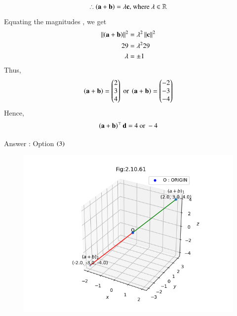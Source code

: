 \documentclass[journal]{IEEEtran}
\numberwithin{equation}{enumi}
\numberwithin{figure}{enumi}
\begin{document}
\begin{align}
   \therefore\left(\mathbf{a} + \mathbf{b}\right) = \lambda\mathbf{c}  \text{, where } \lambda \in \mathbb{R}
\end{align}
Equating the magnitudes , we get 
\begin{align}
    \left\lVert\left(\mathbf{a} + \mathbf{b}\right)\right\rVert^2 &= \lambda^2 \left\lVert\mathbf{c}\right\rVert^2 \\
    29 &= \lambda^2 29 \\ 
    \lambda &= \pm 1 
 \end{align}
Thus, 
\begin{align}
    \left(\mathbf{a} + \mathbf{b}\right) = \begin{pmatrix}2 \\ 3 \\ 4\end{pmatrix} \text{ or } \left(\mathbf{a} + \mathbf{b}\right) = \begin{pmatrix}-2 \\ -3 \\ -4\end{pmatrix}
\end{align}
Hence, 
\begin{align}
    \left(\mathbf{a} + \mathbf{b}\right)^{\top}\mathbf{d} = 4 \text{ or } -4
\end{align}

Answer : Option $\left(3\right)$

\begin{figure}[H]
    \centering
    \includegraphics[width=1\columnwidth]{figs/vector1.png}
    \caption*{}
    \label{fig:}
\end{figure}
\end{document}

